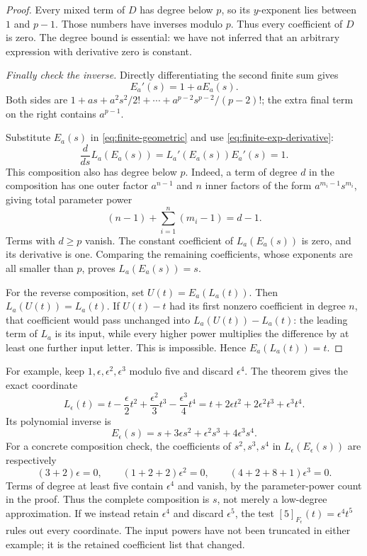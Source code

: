 \documentclass[11pt,letterpaper]{article}
\numberwithin{equation}{section}
\theoremstyle{definition}\newtheorem{example}[theorem]{Example}
\begin{document}
\begin{proof}
Every mixed term of \(D\) has degree below \(p\), so its \(y\)-exponent lies between \(1\) and \(p-1\). Those numbers have inverses modulo \(p\). Thus every coefficient of \(D\) is zero. The degree bound is essential: we have not inferred that an arbitrary expression with derivative zero is constant.

\emph{Finally check the inverse.} Directly differentiating the second finite sum gives
\begin{equation}\label{eq:finite-exp-derivative}
 E_a'(s)=1+aE_a(s).
\end{equation}
Both sides are \(1+as+a^2s^2/2!+\cdots+a^{p-2}s^{p-2}/(p-2)!\); the extra final term on the right contains \(a^{p-1}\).

Substitute \(E_a(s)\) in \eqref{eq:finite-geometric} and use \eqref{eq:finite-exp-derivative}:
\[
 \frac{d}{ds}L_a(E_a(s))
 =L_a'(E_a(s))E_a'(s)=1.
\]
This composition also has degree below \(p\). Indeed, a term of degree \(d\) in the composition has one outer factor \(a^{n-1}\) and \(n\) inner factors of the form \(a^{m_i-1}s^{m_i}\), giving total parameter power
\[
 (n-1)+\sum_{i=1}^{n}(m_i-1)=d-1.
\]
Terms with \(d\ge p\) vanish. The constant coefficient of \(L_a(E_a(s))\) is zero, and its derivative is one. Comparing the remaining coefficients, whose exponents are all smaller than \(p\), proves \(L_a(E_a(s))=s\).

For the reverse composition, set \(U(t)=E_a(L_a(t))\). Then \(L_a(U(t))=L_a(t)\). If \(U(t)-t\) had its first nonzero coefficient in degree \(n\), that coefficient would pass unchanged into \(L_a(U(t))-L_a(t)\): the leading term of \(L_a\) is its input, while every higher power multiplies the difference by at least one further input letter. This is impossible. Hence \(E_a(L_a(t))=t\).
\end{proof}

For example, keep \(1,\epsilon,\epsilon^2,\epsilon^3\) modulo five and discard \(\epsilon^4\). The theorem gives the exact coordinate
\[
 L_\epsilon(t)=t-\frac{\epsilon}{2}t^2
 +\frac{\epsilon^2}{3}t^3-\frac{\epsilon^3}{4}t^4
 =t+2\epsilon t^2+2\epsilon^2t^3+\epsilon^3t^4.
\]
Its polynomial inverse is
\[
 E_\epsilon(s)=s+3\epsilon s^2+\epsilon^2s^3+4\epsilon^3s^4.
\]
For a concrete composition check, the coefficients of \(s^2,s^3,s^4\) in \(L_\epsilon(E_\epsilon(s))\) are respectively
\[
 (3+2)\epsilon=0,\qquad
 (1+2+2)\epsilon^2=0,\qquad
 (4+2+8+1)\epsilon^3=0.
\]
Terms of degree at least five contain \(\epsilon^4\) and vanish, by the parameter-power count in the proof. Thus the complete composition is \(s\), not merely a low-degree approximation.
If we instead retain \(\epsilon^4\) and discard \(\epsilon^5\), the test \([5]_{F_\epsilon}(t)=\epsilon^4t^5\) rules out every coordinate. The input powers have not been truncated in either example; it is the retained coefficient list that changed.
\end{document}
